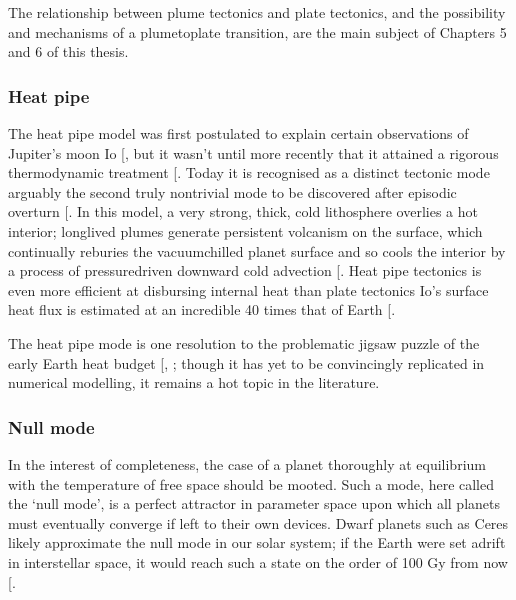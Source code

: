 \documentclass[letterpaper,10pt,english]{jupyterBook}
\begin{document}
\sphinxAtStartPar
The relationship between plume tectonics and plate tectonics, and the possibility and mechanisms of a plume\sphinxhyphen{}to\sphinxhyphen{}plate transition, are the main subject of Chapters 5 and 6 of this thesis.


\subsubsection{Heat pipe}
\label{\detokenize{content/chapter_01_background/main:heat-pipe}}
\sphinxAtStartPar
The heat pipe model was first postulated to explain certain observations of Jupiter’s moon Io {[}\sphinxcite{references:id407}{]}, but it wasn’t until more recently that it attained a rigorous thermodynamic treatment {[}\sphinxcite{references:id181}{]}. Today it is recognised as a distinct tectonic mode \sphinxhyphen{} arguably the second truly non\sphinxhyphen{}trivial mode to be discovered after episodic overturn {[}\sphinxcite{references:id647}{]}. In this model, a very strong, thick, cold lithosphere overlies a hot interior; long\sphinxhyphen{}lived plumes generate persistent volcanism on the surface, which continually re\sphinxhyphen{}buries the vacuum\sphinxhyphen{}chilled planet surface and so cools the interior by a process of pressure\sphinxhyphen{}driven downward cold advection {[}\sphinxcite{references:id391}{]}. Heat pipe tectonics is even more efficient at disbursing internal heat than plate tectonics \sphinxhyphen{} Io’s surface heat flux is estimated at an incredible 40 times that of Earth {[}\sphinxcite{references:id505}{]}.

\sphinxAtStartPar
The heat pipe mode is one resolution to the problematic jigsaw puzzle of the early Earth heat budget {[}, \sphinxcite{references:id767}{]}; though it has yet to be convincingly replicated in numerical modelling, it remains a hot topic in the literature.


\subsubsection{Null mode}
\label{\detokenize{content/chapter_01_background/main:null-mode}}
\sphinxAtStartPar
In the interest of completeness, the case of a planet thoroughly at equilibrium with the temperature of free space should be mooted. Such a mode, here called the ‘null mode’, is a perfect attractor in parameter space upon which all planets must eventually converge if left to their own devices. Dwarf planets such as Ceres likely approximate the null mode in our solar system; if the Earth were set adrift in interstellar space, it would reach such a state on the order of 100 Gy from now {[}\sphinxcite{references:id474}{]}.
\end{document}
